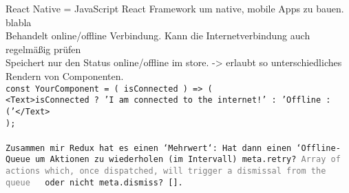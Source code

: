 React Native = JavaScript React Framework um native, mobile Apps zu bauen. blabla\\
Behandelt online/offline Verbindung. Kann die Internetverbindung auch regelmäßig prüfen\\
Speichert nur den Status online/offline im store. -> erlaubt so unterschiedliches Rendern von Componenten.\\

\tt{const YourComponent = ({ isConnected }) => (\\
  <Text>{isConnected ? 'I am connected to the internet!' : 'Offline :('}</Text>\\
  );\\}\\
  Zusammen mir Redux hat es einen `Mehrwert`:
  Hat dann einen `Offline-\gls{Queue} um Aktionen zu wiederholen (im Intervall) \tt{meta.retry? \textcolor{gray}  {Array of actions which, once dispatched, will trigger a dismissal from the queue}} ~ oder nicht \tt{meta.dismiss? []}.\cite{rn-offline-gh}
